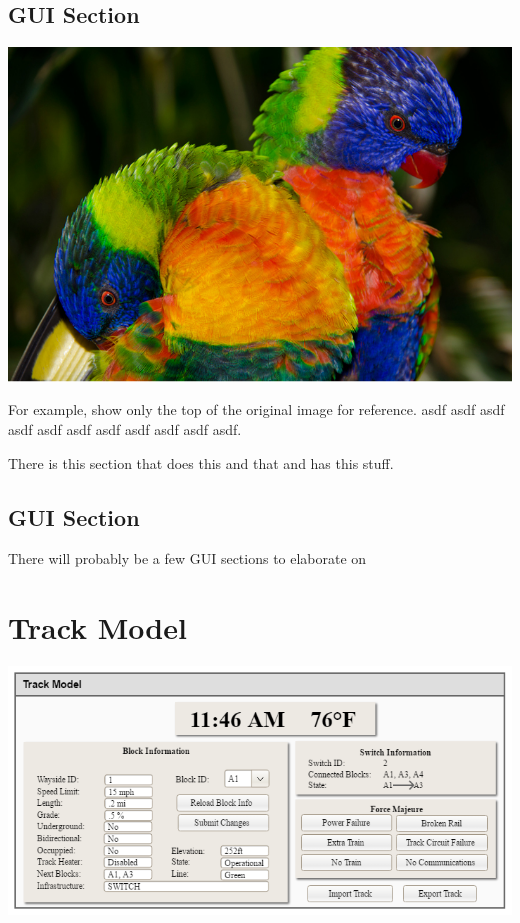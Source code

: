 \documentclass{scrreprt}
\begin{document}
\section{GUI Section}

\includegraphics[trim={0 10cm 0 0},clip,width=\textwidth]{sample}

For example, show only the top of the original image for reference. asdf asdf asdf
asdf asdf asdf asdf asdf asdf asdf asdf.

There is this section that does this and that and has this stuff.

\section{GUI Section}
There will probably be a few GUI sections to elaborate on

\chapter{Track Model}

\includegraphics[width=\textwidth]{track-model}
\end{document}
